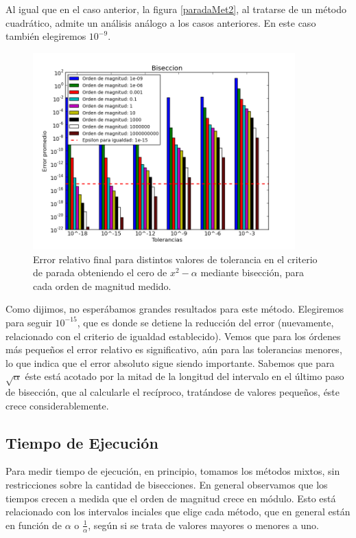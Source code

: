 Al igual que en el caso anterior, la figura \ref{paradaMet2}, al tratarse de un método cuadrático, admite un análisis análogo a los casos anteriores. En este caso también elegiremos $10^{-9}$.

\begin{figure}[H]
  \centering
    \includegraphics[width=0.9\textwidth]{../data/BiseccionF.png}
    \caption{Error relativo final para distintos valores de tolerancia en el criterio de parada obteniendo el cero de $x^2 - \alpha$ mediante bisección, para cada orden de magnitud medido.}
    \label{paradaMet3}
\end{figure}

Como dijimos, no esperábamos grandes resultados para este método. Elegiremos para seguir $10^{-15}$, que es donde se detiene la reducción del error (nuevamente, relacionado con el criterio de igualdad establecido). Vemos que para los órdenes más pequeños el error relativo es significativo, aún para las tolerancias menores, lo que indica que el error absoluto sigue siendo importante. Sabemos que para $\sqrt{\alpha}$ éste está acotado por la mitad de la longitud del intervalo en el último paso de bisección, que al calcularle el recíproco, tratándose de valores pequeños, éste crece considerablemente.

\subsection{Tiempo de Ejecución}

Para medir tiempo de ejecución, en principio, tomamos los métodos mixtos, sin restricciones sobre la cantidad de bisecciones. En general observamos que los tiempos crecen a medida que el orden de magnitud crece en módulo. Esto está relacionado con los intervalos inciales que elige cada método, que en general están en función de $\alpha$ o $\frac{1}{\alpha}$, según si se trata de valores mayores o menores a uno.
 
